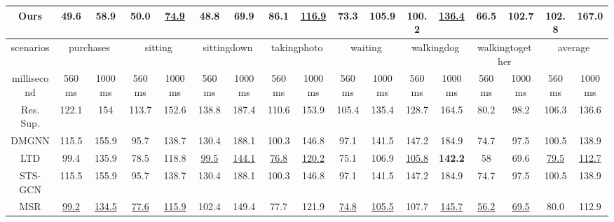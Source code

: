 \begin{table*}[h]
{\begin{tabular}{c|cc|cc|cc|cc|cc|cc|cc|cc}
        Ours   & \textbf{49.6} & \textbf{58.9}  & \textbf{50.0} & \underline{74.9}           & \textbf{48.8}  & \textbf{69.9}  & \textbf{86.1}  & \underline{116.9}          & \textbf{73.3} & \textbf{105.9} & \textbf{100.2} & \underline{136.4}          & \textbf{66.5}    & \textbf{102.7}   & \textbf{102.8} & \textbf{167.0} \\ \hline
        scenarios   & \multicolumn{2}{c|}{purchases}  & \multicolumn{2}{c|}{sitting}    & \multicolumn{2}{c|}{sittingdown} & \multicolumn{2}{c|}{takingphoto} & \multicolumn{2}{c|}{waiting}    & \multicolumn{2}{c|}{walkingdog}  & \multicolumn{2}{c|}{walkingtogether} & \multicolumn{2}{c}{average}         \\ \hline
        millisecond & 560ms         & 1000ms         & 560ms         & 1000ms         & 560ms          & 1000ms         & 560ms          & 1000ms         & 560ms         & 1000ms         & 560ms          & 1000ms         & 560ms            & 1000ms           & 560ms          & 1000ms         \\ \hline
        Res. Sup.   & 122.1         & 154            & 113.7         & 152.6          & 138.8          & 187.4          & 110.6          & 153.9          & 105.4         & 135.4          & 128.7          & 164.5          & 80.2             & 98.2             & 106.3          & 136.6          \\
        DMGNN & 115.5         & 155.9          & 95.7          & 138.7          & 130.4          & 188.1          & 100.3          & 146.8          & 97.1          & 141.5          & 147.2          & 184.9          & 74.7             & 97.5             & 100.5          & 138.9          \\
        LTD   & 99.4          & 135.9          & 78.5          & 118.8          & \underline{99.5}           & \underline{144.1}          & \underline{76.8}           & \underline{120.2}          & 75.1          & 106.9          & \underline{105.8}          & \textbf{142.2} & 58               & 69.6             & \underline{79.5}           & \underline{112.7}          \\
        STS-GCN & 115.5         & 155.9          & 95.7          & 138.7          & 130.4          & 188.1          & 100.3          & 146.8          & 97.1          & 141.5          & 147.2          & 184.9          & 74.7             & 97.5             & 100.5          & 138.9          \\
        MSR   & \underline{99.2}          & \underline{134.5}          & \underline{77.6}          & \underline{115.9}          & 102.4          & 149.4          & 77.7           & 121.9          & \underline{74.8}          & \underline{105.5}          & 107.7          & \underline{145.7}          & \underline{56.2}             & \underline{69.5}             & 80.0           & 112.9          \\

\end{tabular}}
\end{table*}
